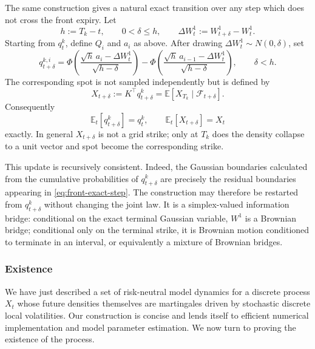 \documentclass[smallextended,envcountsame,envcountsect]{svjour3}
\begin{document}
  The same construction gives a natural exact transition over any step which
  does not cross the front expiry. Let
  \[
    h:=T_k-t,
    \qquad 0<\delta\leq h,
    \qquad \Delta W_t^1:=W_{t+\delta}^1-W_t^1.
  \]
  Starting from $q_t^k$, define $Q_i$ and $a_i$ as above. After drawing
  $\Delta W_t^1\sim N(0,\delta)$, set
  \begin{equation}
    \label{eq:front-exact-step}
    q_{t+\delta}^{k,i}
      =\Phi\!\left(
          \frac{\sqrt h\,a_i-\Delta W_t^1}{\sqrt{h-\delta}}
        \right)
       -\Phi\!\left(
          \frac{\sqrt h\,a_{i-1}-\Delta W_t^1}{\sqrt{h-\delta}}
        \right),
    \qquad \delta<h.
  \end{equation}
  The corresponding spot is not sampled independently but is defined by
  \begin{equation}
    \label{eq:spot-exact-step}
    X_{t+\delta}:=K^\top q_{t+\delta}^k
      =\mathbb E\!\left[X_{T_k}\mid\mathcal F_{t+\delta}\right].
  \end{equation}
  Consequently
  \[
    \mathbb E_t[q_{t+\delta}^k]=q_t^k,
    \qquad
    \mathbb E_t[X_{t+\delta}]=X_t
  \]
  exactly. In general $X_{t+\delta}$ is not a grid strike; only at $T_k$ does
  the density collapse to a unit vector and spot become the corresponding
  strike.

  This update is recursively consistent. Indeed, the Gaussian boundaries
  calculated from the cumulative probabilities of $q_{t+\delta}^k$ are
  precisely the residual boundaries appearing in
  \eqref{eq:front-exact-step}. The construction may therefore be restarted
  from $q_{t+\delta}^k$ without changing the joint law. It is a
  simplex-valued information bridge: conditional on the exact terminal
  Gaussian variable, $W^1$ is a Brownian bridge; conditional only on the
  terminal strike, it is Brownian motion conditioned to terminate in an
  interval, or equivalently a mixture of Brownian bridges.

\subsubsection{Existence}
\label{sec:existence}
We have just described a set of risk-neutral model dynamics for a discrete process $X_t$ whose future densities themselves are martingales driven by stochastic discrete local volatilities. Our construction is concise and lends itself to efficient numerical implementation and model parameter estimation. We now turn to proving the existence of the process. 
\end{document}
